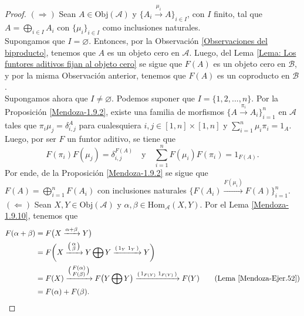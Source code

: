 \documentclass[tesis]{subfiles}
\begin{document}
\begin{proof}

    $(\Rightarrow)$ Sean $A\in\text{Obj}(\mathscr{A})$ y $\{A_i\xrightarrow[]{\mu_i} A\}_{i\in I}$, con $I$ finito, tal que $A=\bigoplus_{i\in I}A_i$ con $\{\mu_i\}_{i\in I}$ como inclusiones naturales. \\

    Supongamos que $I=\varnothing$. Entonces, por la Observación \ref{Observaciones del biproducto}, tenemos que $A$ es un objeto cero en $\mathscr{A}$. Luego, del Lema \ref{Lema: Los funtores aditivos fijan al objeto cero} se sigue que $F(A)$ es un objeto cero en $\mathscr{B}$, y por la misma Observación anterior, tenemos que $F(A)$ es un coproducto en $\mathscr{B}$. \\

    Supongamos ahora que $I\neq\varnothing$. Podemos suponer que $I=\{1,2,...,n\}$. Por la Proposición \ref{Mendoza-1.9.2}, existe una familia de morfismos $\{A\xrightarrow[]{\pi_i} A_i\}_{i=1}^n$ en $\mathscr{A}$ tales que $\pi_i\mu_j = \delta_{i,j}^A$ para cualesquiera $i,j\in[1,n]\times[1,n]$ y $\sum_{i=1}^n \mu_i\pi_i=1_A$. Luego, por ser $F$ un funtor aditivo, se tiene que
    \[
        F(\pi_i)F(\mu_j) = \delta_{i,j}^{F(A)} \quad \text{y} \quad \sum_{i=1}^n F(\mu_i)F(\pi_i) = 1_{F(A)}.
    \] 
    Por ende, de la Proposición \ref{Mendoza-1.9.2} se sigue que $F(A) = \bigoplus_{i=1}^n F(A_i)$ con inclusiones naturales $\big\{F(A_i)\xrightarrow[]{F(\mu_i)} F(A)\big\}_{i=1}^n$. \\

    $(\Leftarrow)$ Sean $X,Y\in\text{Obj}(\mathscr{A})$ y $\alpha,\beta\in\text{Hom}_\mathscr{A}(X,Y)$. Por el Lema \ref{Mendoza-1.9.10}, tenemos que
    \begin{align*}
        F(\alpha+\beta) &= F\big(X\xrightarrow[]{\alpha+\beta}Y\big) \\
                        &= F\bigg( X\xrightarrow[]{\big(\begin{smallmatrix} \alpha \\ \beta \end{smallmatrix}\big)} Y\bigoplus Y \xrightarrow[]{(\begin{smallmatrix} 1_Y &1_Y \end{smallmatrix})} Y \bigg) \\
                        &= F(X)\xrightarrow[]{\big(\begin{smallmatrix} F(\alpha) \\ F(\beta) \end{smallmatrix}\big)} F\big(Y\bigoplus Y\big) \xrightarrow[]{(\begin{smallmatrix} 1_{F(Y)} &1_{F(Y)} \end{smallmatrix})} F(Y) \tag{Lema \ref{Mendoza-Ejer.52}} \\
                        &= F(\alpha) + F(\beta).
    \end{align*}
\end{proof}
\end{document}
